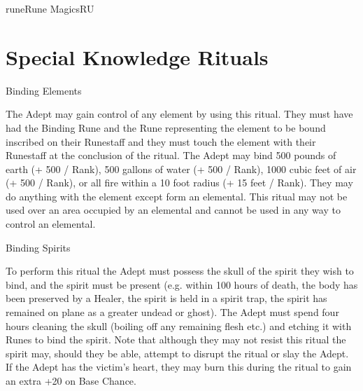 \begin{College}[2.2]{rune}{Rune Magics}{RU}
\section{Special Knowledge Rituals}

\begin{ritual}[R-1]{Binding Elements}

\begin{effects}
The Adept may gain control of any element by using this ritual.  They
must have had the Binding Rune and the Rune representing the element
to be bound inscribed on their Runestaff and they must touch the
element with their Runestaff at the conclusion of the ritual.  The
Adept may bind 500 pounds of earth (+ 500 / Rank), 500 gallons of
water (+ 500 / Rank), 1000 cubic feet of air (+ 500 / Rank), or all
fire within a 10 foot radius (+ 15 feet / Rank).  They may do anything
with the element except form an elemental.  This ritual may not be
used over an area occupied by an elemental and cannot be used in any
way to control an elemental.
\end{effects}
\end{ritual}

\begin{ritual}[R-2]{Binding Spirits}

\begin{effects}
To perform this ritual the Adept must possess the skull of the spirit
they wish to bind, and the spirit must be present (e.g. within 100
hours of death, the body has been preserved by a Healer, the spirit is
held in a spirit trap, the spirit has remained on plane as a greater
undead or ghost). The Adept must spend four hours cleaning the skull
(boiling off any remaining flesh etc.)  and etching it with Runes to
bind the spirit.  Note that although they may not resist this ritual
the spirit may, should they be able, attempt to disrupt the ritual or
slay the Adept.  If the Adept has the victim’s heart, they may burn
this during the ritual to gain an extra +20 on Base Chance.


\end{effects}
\end{ritual}
\end{College}
